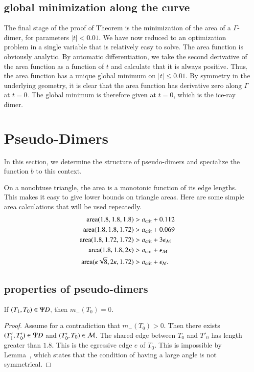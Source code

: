 \subsection{global minimization along the curve}

The final stage of the proof of Theorem  is the
minimization of the area of a $\Gamma$-dimer, for parameters
$|t|<0.01$.  We have now reduced to an optimization problem in a
single variable that is relatively easy to solve.  The area function
is obviously analytic.  By automatic differentiation, we take the
second derivative of the area function as a function of $t$ and
calculate that it is always positive.  Thus, the area function has a
unique global minimum on $|t|\le 0.01$.  By symmetry in the underlying
geometry, it is clear that the area function has derivative zero along
$\Gamma$ at $t=0$.  The global minimum is therefore given at $t=0$,
which is the ice-ray dimer.

\section{Pseudo-Dimers}

In this section, we determine the structure of pseudo-dimers and
specialize the function $b$ to this context.

On a nonobtuse triangle, the area is a monotonic function of its edge
lengths.  This makes it easy to give lower bounds on triangle areas.
Here are some simple area calculations that will be used repeatedly.
\begin{align*}
{\operatorname{area}}(1.8,1.8,1.8) &> a_\text{crit} + 0.112\\
{\operatorname{area}}(1.8,1.8,1.72) &> a_\text{crit} + 0.069\\
{\operatorname{area}}(1.8,1.72,1.72) &> a_\text{crit} + 3\epsilon_{\mathcal M}\\
{\operatorname{area}}(1.8,1.8,2\kappa) &> a_\text{crit} + \epsilon_{\mathcal M}\\
{\operatorname{area}}(\kappa\sqrt8,2\kappa,1.72) &> a_\text{crit} +\epsilon_{\mathcal N}.
\end{align*}


\subsection{properties of pseudo-dimers}

\begin{lemma}  
If $(T_1,T_0)\in\Psi D$, then $m_-(T_0)=0$.
\end{lemma}

\begin{proof} 
  Assume for a contradiction that $m_-(T_0)>0$.  Then there exists
  $(T'_1,T_0')\in\Psi D$ and $(T'_0,T_0)\in\mathcal M$.  The shared edge between
  $T_0$ and $T'_0$ has length greater than $1.8$.  This is the
  egressive edge $e$ of $T_0$.  This is impossible by
  Lemma~, which states that the condition of having a
  large angle is not symmetrical.
\end{proof}

